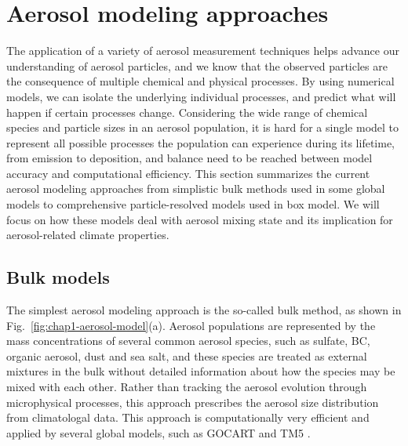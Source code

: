 \documentclass[edeposit,fullpage]{uiucthesis2009}
\begin{document}
\section{Aerosol modeling approaches}
The application of a variety of aerosol measurement techniques helps
advance our understanding of aerosol particles, and we know that the
observed particles are the consequence of multiple chemical and
physical processes. By using numerical models, we can isolate the
underlying individual processes, and predict what will happen if
certain processes change. Considering the wide range of chemical
species and particle sizes in an aerosol population, it is hard for a
single model to represent all possible processes the population can
experience during its lifetime, from emission to deposition, and
balance need to be reached between model accuracy and computational
efficiency. This section summarizes the current aerosol modeling
approaches from simplistic bulk methods used in some global models to
comprehensive particle-resolved models used in box model. We will
focus on how these models deal with aerosol mixing state and its
implication for aerosol-related climate properties.

\subsection{Bulk models}
The simplest aerosol modeling approach is the so-called bulk
method, as shown in Fig.~\ref{fig:chap1-aerosol-model}(a). 
Aerosol populations are represented by the mass concentrations
of several common aerosol species, such as sulfate, BC, organic
aerosol, dust and sea salt, and these species are treated as external
mixtures in the bulk without detailed information about how the
species may be mixed with each other. Rather than tracking the aerosol
evolution through microphysical processes, this approach prescribes
the aerosol size distribution from climatologal data. This approach is
computationally very efficient and applied by several global models,
such as GOCART \citep{chin2000atmospheric} and TM5
\citep{vignati2010sources}.
\end{document}
